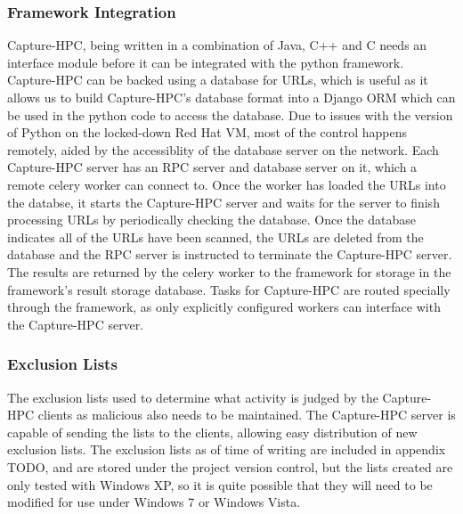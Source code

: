 \subsubsection{Framework Integration}

Capture-HPC, being written in a combination of Java, C++ and C needs an
interface module before it can be integrated with the python framework.
Capture-HPC can be backed using a database for URLs, which is useful as it
allows us to build Capture-HPC's database format into a Django ORM which can
be used in the python code to access the database. Due to issues with the
version of Python on the locked-down Red Hat VM, most of the control happens
remotely, aided by the accessiblity of the database server on the network. Each
Capture-HPC server has an RPC server and database server on it, which a remote
celery worker can connect to. Once the worker has loaded the URLs into the
databse, it starts the Capture-HPC server and waits for the server to finish
processing URLs by periodically checking the database. Once the database
indicates all of the URLs have been scanned, the URLs are deleted from the
database and the RPC server is instructed to terminate the Capture-HPC server.
The results are returned by the celery worker to the framework for storage in
the framework's result storage database. Tasks for Capture-HPC are routed
specially through the framework, as only explicitly configured workers can
interface with the Capture-HPC server.

\subsubsection{Exclusion Lists}

The exclusion lists used to determine what activity is judged by the Capture-HPC
clients as malicious also needs to be maintained. The Capture-HPC server is
capable of sending the lists to the clients, allowing easy distribution of new
exclusion lists. The exclusion lists as of time of writing are included in
appendix TODO, and are stored under the project version control, but the lists
created are only tested with Windows XP, so it is quite possible that they will
need to be modified for use under Windows 7 or Windows Vista.

